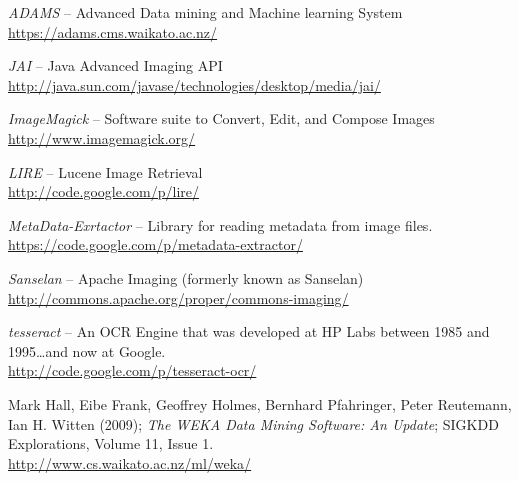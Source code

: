 %

\begin{thebibliography}{999}

		\textit{ADAMS} -- Advanced Data mining and Machine learning System \\
		\url{https://adams.cms.waikato.ac.nz/}{}

	 	\textit{JAI} -- Java Advanced Imaging API \\
		\url{http://java.sun.com/javase/technologies/desktop/media/jai/}{}

		\textit{ImageMagick} -- Software suite to Convert, Edit, and Compose Images \\
		\url{http://www.imagemagick.org/}{}

		\textit{LIRE} -- Lucene Image Retrieval \\
		\url{http://code.google.com/p/lire/}{}

		\textit{MetaData-Exrtactor} -- Library for reading metadata from image files.  \\
		\url{https://code.google.com/p/metadata-extractor/}{}

		\textit{Sanselan} -- Apache Imaging (formerly known as Sanselan) \\
		\url{http://commons.apache.org/proper/commons-imaging/}{}

		\textit{tesseract} -- An OCR Engine that was developed at HP Labs between 1985 and 1995\ldots and now at Google. \\
		\url{http://code.google.com/p/tesseract-ocr/}{}

	 	Mark Hall, Eibe Frank, Geoffrey Holmes, Bernhard Pfahringer, Peter
	 	Reutemann, Ian H. Witten (2009); \textit{The WEKA Data Mining Software: An
	 	Update}; SIGKDD Explorations, Volume 11, Issue 1. \\
		\url{http://www.cs.waikato.ac.nz/ml/weka/}{}

\end{thebibliography}
